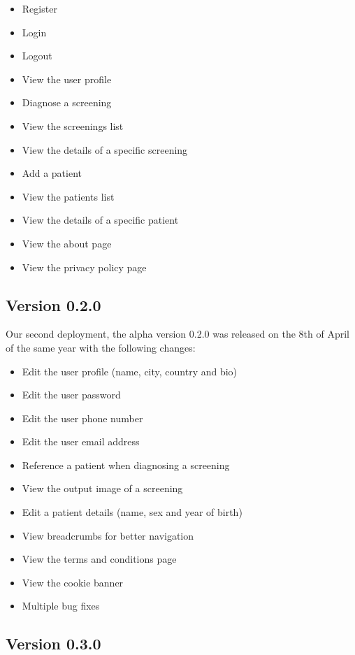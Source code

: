 \begin{itemize}

\item
Register
\item
Login
\item
Logout
\item
View the user profile
\item
Diagnose a screening
\item
View the screenings list
\item
View the details of a specific screening
\item
Add a patient
\item
View the patients list
\item
View the details of a specific patient
\item
View the about page
\item
View the privacy policy page

\end{itemize}

\subsection{Version 0.2.0}

Our second deployment, the alpha version 0.2.0 was released on the 8th of April of the same year with the following changes:

\begin{itemize}

\item
Edit the user profile (name, city, country and bio)
\item
Edit the user password
\item
Edit the user phone number
\item
Edit the user email address
\item
Reference a patient when diagnosing a screening
\item
View the output image of a screening
\item
Edit a patient details (name, sex and year of birth)
\item
View breadcrumbs for better navigation
\item
View the terms and conditions page
\item
View the cookie banner
\item
Multiple bug fixes

\end{itemize}

\subsection{Version 0.3.0}

